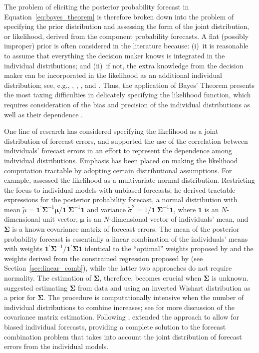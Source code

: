 \documentclass[11pt]{article}
\begin{document}
The problem of eliciting the posterior probability forecast in Equation~\eqref{eq:bayes_theorem} is therefore broken down into the problem of specifying the prior distribution and assessing the form of the joint distribution, or likelihood, derived from the component probability forecasts. A flat (possibly improper) prior is often considered in the literature because: (i)~it is reasonable to assume that everything the decision maker knows is integrated in the individual distributions; and (ii)~if not, the extra knowledge from the decision maker can be incorporated in the likelihood as an additional individual distribution; see, e.g., \citet{Winkler1968-uw}, \citet{Clemen1993-ty}, \citet{Clemen1985-kx}, and \citet{Jouini1996-fe}. Thus, the application of Bayes' Theorem presents the most taxing difficulties in delicately specifying the likelihood function, which requires consideration of the bias and precision of the individual distributions as well as their dependence \citep{Hall2007-lh}.

One line of research has considered specifying the likelihood as a joint distribution of forecast errors, and supported the use of the correlation between individuals' forecast errors in an effort to represent the dependence among individual distributions. Emphasis has been placed on making the likelihood computation tractable by adopting certain distributional assumptions. For example, \citet{Winkler1981-bn} assessed the likelihood as a multivariate normal distribution. Restricting the focus to individual models with unbiased forecasts, he derived tractable expressions for the posterior probability forecast, a normal distribution with mean $\tilde{\mu} = \bm{1}^{\prime} \bm{\Sigma}^{-1} \bm{\mu} / \bm{1}^{\prime} \bm{\Sigma}^{-1} \bm{1}$ and variance $\tilde{\sigma}^{2} = 1/\bm{1}^{\prime} \bm{\Sigma}^{-1} \bm{1}$, where $\bm{1}$ is an $N$-dimensional unit vector, $\bm{\mu}$ is an $N$-dimensional vector of individuals' mean, and $\bm{\Sigma}$ is a known covariance matrix of forecast errors. The mean of the posterior probability forecast is essentially a linear combination of the individuals' means with weights $\bm{1}^{\prime} \bm{\Sigma}^{-1} / \bm{1}^{\prime} \bm{\Sigma} \bm{1}$ identical to the ``optimal'' weights proposed by \citet{Bates1969-yj} and the weights derived from the constrained regression proposed by \citet{Granger1984-jc} (see Section~\ref{sec:linear_comb}), while the latter two approaches do not require normality. The estimation of $\bm{\Sigma}$, therefore, becomes crucial when $\bm{\Sigma}$ is unknown. \citet{Winkler1981-bn} suggested estimating $\bm{\Sigma}$ from data and using an inverted Wishart distribution as a prior for $\bm{\Sigma}$. The procedure is computationally intensive when the number of individual distributions to combine increases; see \citet{Hall2007-lh} for more discussion of the covariance matrix estimation. Following \citet{Winkler1981-bn}, \citet{Palm1992-im} extended the approach to allow for biased individual forecasts, providing a complete solution to the forecast combination problem that takes into account the joint distribution of forecast errors from the individual models.
\end{document}
